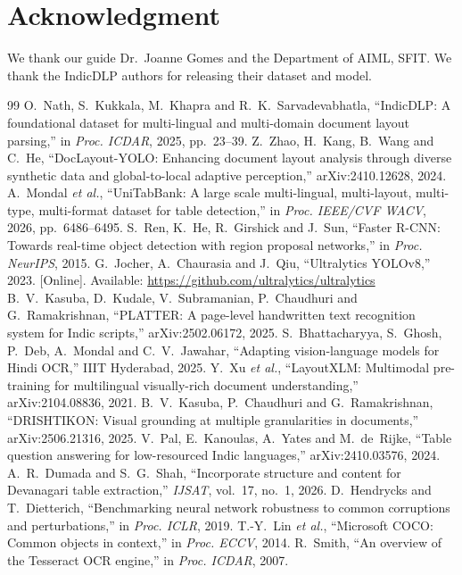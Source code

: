 \documentclass[conference]{IEEEtran}
\begin{document}
\section*{Acknowledgment}
We thank our guide Dr.~Joanne Gomes and the Department of AIML, SFIT. We thank the IndicDLP authors for releasing
their dataset and model.

\begin{thebibliography}{99}
 O.~Nath, S.~Kukkala, M.~Khapra and R.~K.~Sarvadevabhatla, ``IndicDLP: A foundational dataset for multi-lingual and multi-domain document layout parsing,'' in \emph{Proc. ICDAR}, 2025, pp.~23--39.
 Z.~Zhao, H.~Kang, B.~Wang and C.~He, ``DocLayout-YOLO: Enhancing document layout analysis through diverse synthetic data and global-to-local adaptive perception,'' arXiv:2410.12628, 2024.
 A.~Mondal \emph{et al.}, ``UniTabBank: A large scale multi-lingual, multi-layout, multi-type, multi-format dataset for table detection,'' in \emph{Proc. IEEE/CVF WACV}, 2026, pp.~6486--6495.
 S.~Ren, K.~He, R.~Girshick and J.~Sun, ``Faster R-CNN: Towards real-time object detection with region proposal networks,'' in \emph{Proc. NeurIPS}, 2015.
 G.~Jocher, A.~Chaurasia and J.~Qiu, ``Ultralytics YOLOv8,'' 2023. [Online]. Available: \url{https://github.com/ultralytics/ultralytics}
 B.~V.~Kasuba, D.~Kudale, V.~Subramanian, P.~Chaudhuri and G.~Ramakrishnan, ``PLATTER: A page-level handwritten text recognition system for Indic scripts,'' arXiv:2502.06172, 2025.
 S.~Bhattacharyya, S.~Ghosh, P.~Deb, A.~Mondal and C.~V.~Jawahar, ``Adapting vision-language models for Hindi OCR,'' IIIT Hyderabad, 2025.
 Y.~Xu \emph{et al.}, ``LayoutXLM: Multimodal pre-training for multilingual visually-rich document understanding,'' arXiv:2104.08836, 2021.
 B.~V.~Kasuba, P.~Chaudhuri and G.~Ramakrishnan, ``DRISHTIKON: Visual grounding at multiple granularities in documents,'' arXiv:2506.21316, 2025.
 V.~Pal, E.~Kanoulas, A.~Yates and M.~de~Rijke, ``Table question answering for low-resourced Indic languages,'' arXiv:2410.03576, 2024.
 A.~R.~Dumada and S.~G.~Shah, ``Incorporate structure and content for Devanagari table extraction,'' \emph{IJSAT}, vol.~17, no.~1, 2026.
 D.~Hendrycks and T.~Dietterich, ``Benchmarking neural network robustness to common corruptions and perturbations,'' in \emph{Proc. ICLR}, 2019.
 T.-Y.~Lin \emph{et al.}, ``Microsoft COCO: Common objects in context,'' in \emph{Proc. ECCV}, 2014.
 R.~Smith, ``An overview of the Tesseract OCR engine,'' in \emph{Proc. ICDAR}, 2007.
\end{thebibliography}
\end{document}
